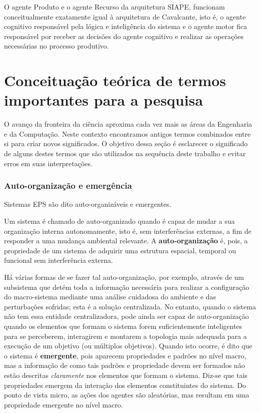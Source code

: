 O agente Produto e o agente Recurso da arquitetura SIAPE, funcionam conceitualmente exatamente igual à arquitetura de Cavalcante, isto é, o agente cognitivo responsável pela lógica e inteligência do sistema e o agente motor fica responsável por receber as decisões do agente cognitivo e realizar as operações necessárias no processo produtivo.



\section{Conceituação teórica de termos importantes para a pesquisa}	

O avanço da fronteira da ciência aproxima cada vez mais as áreas da Engenharia e da Computação. Neste contexto encontramos antigos termos combinados entre si para criar novos significados. O objetivo dessa seção é esclarecer o significado de alguns destes termos que são utilizados na sequência deste trabalho e evitar erros em suas interpretações.



\subsubsection{Auto-organização e emergência}

Sistemas EPS são dito auto-organizáveis e emergentes. 

Um sistema é chamado de auto-organizado quando é capaz de mudar a sua organização interna autonomamente, isto é, sem interferências externas, a fim de responder a uma mudança ambiental relevante. A \textbf{auto-organização} é, pois, a propriedade de um sistema de adquirir uma estrutura espacial, temporal ou funcional sem interferência externa. 

Há várias formas de se fazer tal auto-organização, por exemplo, através de um subsistema que detém toda a informação necessária para realizar a configuração do macro-sistema mediante uma análise cuidadosa do ambiente e das perturbações sofridas; esta é a solução centralizada. No entanto, quando o sistema não tem essa entidade centralizadora, pode ainda ser capaz de auto-organização quando os elementos que formam o sistema forem suficientemente inteligentes para se perceberem, interagirem e montarem a topologia mais adequada para a execução de um objetivo (ou múltiplos objetivos). Quando isto ocorre, é dito que o sistema é \textbf{emergente}, pois aparecem propriedades e padrões no nível macro, mas a informação de como tais padrões e propriedade devem ser formados não estão descritas \textit{claramente} nos elementos que formam o sistema. Diz-se que tais propriedades emergem da interação dos elementos constituintes do sistema. Do ponto de vista micro, as ações dos agentes são aleatórias, mas resultam em uma propriedade emergente no nível macro.

